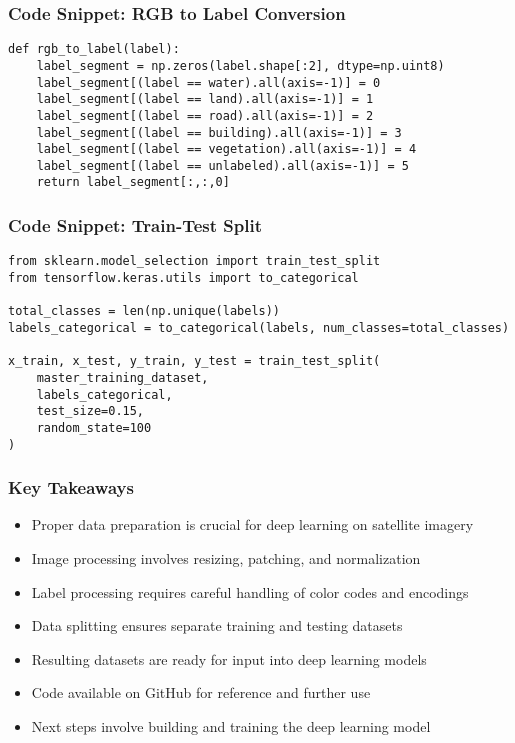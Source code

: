 \begin{frame}[fragile]\frametitle{Code Snippet: RGB to Label Conversion}
\begin{lstlisting}
def rgb_to_label(label):
    label_segment = np.zeros(label.shape[:2], dtype=np.uint8)
    label_segment[(label == water).all(axis=-1)] = 0
    label_segment[(label == land).all(axis=-1)] = 1
    label_segment[(label == road).all(axis=-1)] = 2
    label_segment[(label == building).all(axis=-1)] = 3
    label_segment[(label == vegetation).all(axis=-1)] = 4
    label_segment[(label == unlabeled).all(axis=-1)] = 5
    return label_segment[:,:,0]
\end{lstlisting}
\end{frame}

\begin{frame}[fragile]\frametitle{Code Snippet: Train-Test Split}
\begin{lstlisting}
from sklearn.model_selection import train_test_split
from tensorflow.keras.utils import to_categorical

total_classes = len(np.unique(labels))
labels_categorical = to_categorical(labels, num_classes=total_classes)

x_train, x_test, y_train, y_test = train_test_split(
    master_training_dataset, 
    labels_categorical, 
    test_size=0.15, 
    random_state=100
)
\end{lstlisting}
\end{frame}

\begin{frame}[fragile]\frametitle{Key Takeaways}
\begin{itemize}
\item Proper data preparation is crucial for deep learning on satellite imagery
\item Image processing involves resizing, patching, and normalization
\item Label processing requires careful handling of color codes and encodings
\item Data splitting ensures separate training and testing datasets
\item Resulting datasets are ready for input into deep learning models
\item Code available on GitHub for reference and further use
\item Next steps involve building and training the deep learning model
\end{itemize}
\end{frame}



